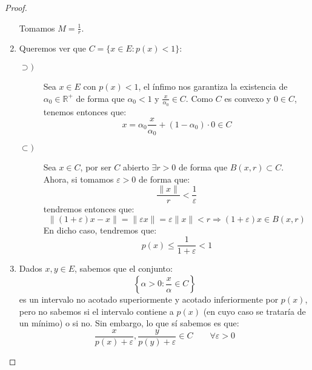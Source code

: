 \begin{prop}
\begin{proof}
\begin{enumerate}
                Tomamos $M = \frac{1}{r}$.
            \item Queremos ver que $C= \{x\in E : p(x) < 1\}$:
                \begin{description}
                    \item [$\supset )$] Sea $x\in E$ con $p(x)<1$, el ínfimo nos garantiza la existencia de $\alpha_0\in \mathbb{R}^+$ de forma que $\alpha_0 < 1$ y $\frac{x}{\alpha_0}\in C$. Como $C$ es convexo y $0\in C$, tenemos entonces que:
                        \begin{equation*}
                            x = \alpha_0\dfrac{x}{\alpha_0}+(1-\alpha_0)\cdot 0 \in C
                        \end{equation*}
                    \item [$\subset )$] Sea $x\in C$, por ser $C$ abierto $\exists r>0$ de forma que $B(x,r)\subset C$. Ahora, si tomamos $\varepsilon>0$ de forma que:
                        \begin{equation*}
                            \dfrac{\|x\|}{r}< \dfrac{1}{\varepsilon}
                        \end{equation*}
                        tendremos entonces que:
                        \begin{equation*}
                            \|(1+\varepsilon)x-x\| = \|\varepsilon x\| = \varepsilon \|x\| < r \Longrightarrow (1+\varepsilon)x\in B(x,r)
                        \end{equation*}
                        En dicho caso, tendremos que:
                        \begin{equation*}
                            p(x) \leq \dfrac{1}{1+\varepsilon}<1
                        \end{equation*}
                \end{description}
            \item Dados $x,y\in E$, sabemos que el conjunto:
                \begin{equation*}
                    \left\{\alpha> 0 : \dfrac{x}{\alpha}\in C\right\}
                \end{equation*}
                es un intervalo no acotado superiormente y acotado inferiormente por $p(x)$, pero no sabemos si el intervalo contiene a $p(x)$ (en cuyo caso se trataría de un mínimo) o si no. Sin embargo, lo que sí sabemos es que:
                \begin{equation*}
                    \dfrac{x}{p(x)+\varepsilon},\dfrac{y}{p(y)+\varepsilon} \in C \qquad \forall \varepsilon>0

\end{equation*}
\end{enumerate}
\end{proof}
\end{prop}
